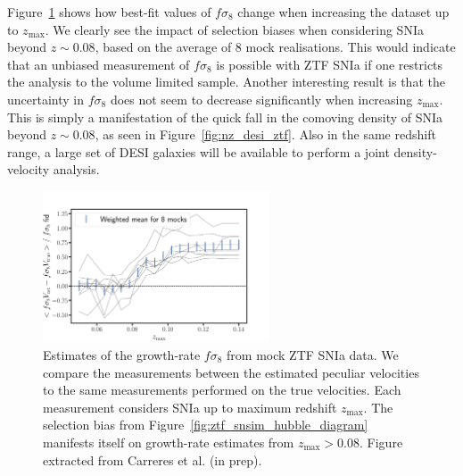 Figure~\ref{fig:ztf_snsim_fs8_bias} shows how best-fit values of $f\sigma_8$ change when 
increasing the dataset up to $z_\text{max}$. We clearly see the impact of selection biases 
when considering SNIa beyond $z\sim 0.08$, based on the average of 8 mock realisations. 
This would indicate that an unbiased measurement of $f\sigma_8$ is possible with ZTF SNIa
if one restricts the analysis to the volume limited sample. 
Another interesting result is that the uncertainty in $f\sigma_8$ does not seem to 
decrease significantly when increasing $z_\text{max}$. This is simply a manifestation 
of the quick fall in the comoving density of SNIa beyond $z\sim0.08$, as seen in 
Figure~\ref{fig:nz_desi_ztf}. 
Also in the same redshift range, a large set of DESI galaxies will be available to 
perform a joint density-velocity analysis. 

\begin{figure}
    \centering
    \includegraphics[width=0.6\textwidth]{fig/velocities/bastien_fs8_bias.pdf}
    \caption{Estimates of the growth-rate $f\sigma_8$ from mock ZTF SNIa data. 
    We compare the measurements between the estimated peculiar velocities to the 
    same measurements performed on the true velocities. 
    Each measurement considers SNIa up to maximum redshift $z_\text{max}$.
    The selection bias from Figure~\ref{fig:ztf_snsim_hubble_diagram} manifests itself
    on growth-rate estimates from $z_\text{max}>0.08$. 
    Figure extracted from Carreres et al. (in prep).}
    \label{fig:ztf_snsim_fs8_bias}
\end{figure}

